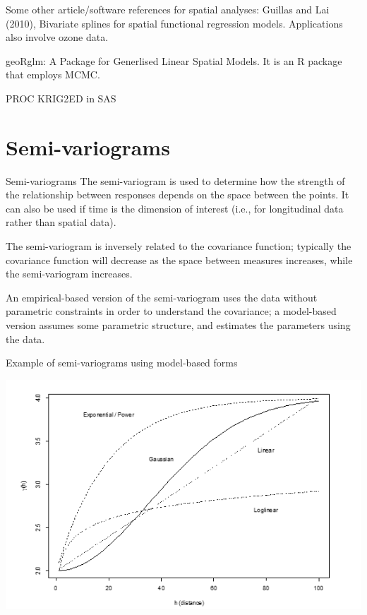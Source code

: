 \documentclass[
  9pt,
  ignorenonframetext,
]{beamer}
\begin{document}
\begin{frame}{Some other article/software references for spatial
analyses:}
\protect\hypertarget{some-other-articlesoftware-references-for-spatial-analyses}{}
Guillas and Lai (2010), Bivariate splines for spatial functional
regression models. Applications also involve ozone data.

geoRglm: A Package for Generlised Linear Spatial Models. It is an R
package that employs MCMC.

PROC KRIG2ED in SAS
\end{frame}

\hypertarget{semi-variograms}{%
\section{Semi-variograms}\label{semi-variograms}}

\begin{frame}{Semi-variograms}
\protect\hypertarget{semi-variograms-1}{}
The semi-variogram is used to determine how the strength of the
relationship between responses depends on the space between the points.
It can also be used if time is the dimension of interest (i.e., for
longitudinal data rather than spatial data).

The semi-variogram is inversely related to the covariance function;
typically the covariance function will decrease as the space between
measures increases, while the semi-variogram increases.

An empirical-based version of the semi-variogram uses the data without
parametric constraints in order to understand the covariance; a
model-based version assumes some parametric structure, and estimates the
parameters using the data.
\end{frame}

\begin{frame}{Example of semi-variograms using model-based forms}
\protect\hypertarget{example-of-semi-variograms-using-model-based-forms}{}
\begin{center}\includegraphics[width=0.7\linewidth]{figs_L22/f9} \end{center}
\end{frame}
\end{document}
